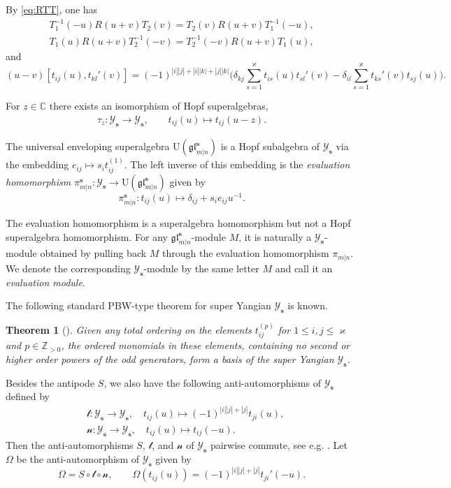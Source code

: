\documentclass[11pt,reqno]{amsart}
\numberwithin{equation}{section}
\newtheorem{thm}{Theorem}[section]
\theoremstyle{definition}
\theoremstyle{remark}
\newcommand{\beq}{\begin{equation}}
\newcommand{\eeq}{\end{equation}}
\newcommand{\C}{\mathbb{C}}
\newcommand{\mc}{\mathcal}
\newcommand{\lle}{\leqslant}
\newcommand{\glMN}{\mathfrak{gl}_{m|n}^{\bm s}}
\newcommand{\UglMN}{\mathrm{U}(\mathfrak{gl}_{m|n}^\s)}
\newcommand{\YglMN}{\mathscr{Y}_{\bm s}}
\newcommand{\YMN}{{\mathscr{Y}_{\bm s}}}
\newcommand{\ka}{\varkappa}
\newcommand{\s}{{\bm s}}
\begin{document}
By \eqref{eq:RTT}, one has
\beq\label{eq:T'RT}
\begin{split}
T_1^{-1}(-u)R(u+v)T_2(v)=T_2(v)R(u+v)T_1^{-1}(-u),\\
T_1(u)R(u+v)T_2^{-1}(-v)=T_2^{-1}(-v)R(u+v)T_1(u),
\end{split}
\eeq
and
\beq\label{eq:tt'}
(u-v)[t_{ij}(u),t_{kl}'(v)]=(-1)^{|i||j|+|i||k|+|j||k|}\Big(\delta_{kj}\sum_{s=1}^\ka t_{is}(u)t_{sl}'(v)-\delta_{il}\sum_{s=1}^{\ka}t_{ks}'(v)t_{sj}(u)\Big).
\eeq

For $z\in\C$ there exists an isomorphism of Hopf superalgebras,
\begin{align}
\tau_z:\YglMN\to\YglMN, \qquad t_{ij}(u)\mapsto t_{ij}(u-z).\label{eq tau z}
\end{align}

The universal enveloping superalgebra $\mathrm U(\glMN)$ is a Hopf subalgebra of $\YglMN$ via the embedding $e_{ij}\mapsto s_it_{ij}^{(1)}$. The left inverse of this embedding is the \emph{evaluation homomorphism} $\pi_{m|n}^\s: \YglMN\to \UglMN$ given by
\beq\label{eq:evaluation-map}
\pi_{m|n}^\s: t_{ij}(u)\mapsto \delta_{ij}+s_ie_{ij}u^{-1}.
\eeq

The evaluation homomorphism is a superalgebra homomorphism but not a Hopf superalgebra homomorphism.
For any $\glMN$-module $M$, it is naturally a $\YglMN$-module obtained by pulling back $M$ through the evaluation homomorphism $\pi_{m|n}$. We denote the corresponding $\YglMN$-module by the same letter $M$ and call it an \emph{evaluation module}.

The following standard PBW-type theorem for super Yangian $\YMN$ is known.
\begin{thm}[{\cite{Gow2007gauss,Peng2016parabolic}}]\label{thm:PBW}
Given any total ordering on the elements $t_{ij}^{(p)}$ for $1\lle i,j\lle \ka$ and $p\in\mathbb Z_{>0}$, the ordered monomials in these elements, containing no second or higher
order powers of the odd generators, form a basis of the super Yangian $\YMN$.
\end{thm}

Besides the antipode $S$, we also have the following anti-automorphisms of $\YMN$ defined by
\begin{align*}
&\mc t:\YMN\to\YMN,\quad t_{ij}(u)\mapsto (-1)^{|i||j|+|j|}t_{ji}(u),\\%
&\mc n:\YMN\to\YMN,\quad t_{ij}(u)\mapsto t_{ij}(-u).%
\end{align*}
Then the anti-automorphisms $S$, $\mc t$, and $\mc n$ of $\YMN$ pairwise commute, see e.g. \cite[Proposition 1.5]{Nazarov2020yangian}. Let $\Omega$ be the anti-automorphism of $\YMN$ given by
\beq\label{Omega}
\Omega=S\circ \mc t\circ \mc n,\qquad \Omega(t_{ij}(u))=(-1)^{|i||j|+|j|}t_{ji}'(-u).
\eeq
\end{document}
